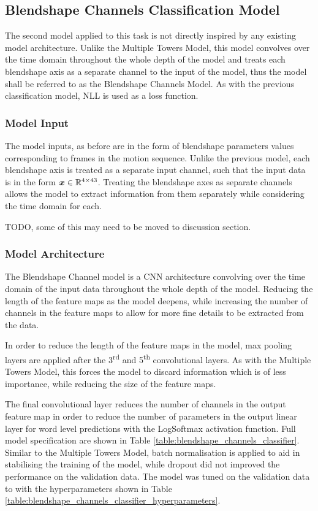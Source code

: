 \subsection{Blendshape Channels Classification Model}
The second model applied to this task is not directly inspired by any existing model architecture.
Unlike the Multiple Towers Model, this model convolves over the time domain throughout the whole depth of the model and treats each blendshape axis as a separate channel to the input of the model, thus the model shall be referred to as the Blendshape Channels Model.
As with the previous classification model, NLL is used as a loss function.

\subsubsection{Model Input}
The model inputs, as before are in the form of blendshape parameters values corresponding to frames in the motion sequence.
Unlike the previous model, each blendshape axis is treated as a separate input channel, such that the input data is in the form ${\boldsymbol{{x}}} \in \mathbb{R}^{4 \times 43}$.
Treating the blendshape axes as separate channels allows the model to extract information from them separately while considering the time domain for each.

TODO, some of this may need to be moved to discussion section.

\subsubsection{Model Architecture}
The Blendshape Channel model is a CNN architecture convolving over the time domain of the input data throughout the whole depth of the model.
Reducing the length of the feature maps as the model deepens, while increasing the number of channels in the feature maps to allow for more fine details to be extracted from the data.

In order to reduce the length of the feature maps in the model, max pooling layers are applied after the 3\textsuperscript{rd} and 5\textsuperscript{th} convolutional layers.
As with the Multiple Towers Model, this forces the model to discard information which is of less importance, while reducing the size of the feature maps.

The final convolutional layer reduces the number of channels in the output feature map in order to reduce the number of parameters in the output linear layer for word level predictions with the LogSoftmax activation function.
Full model specification are shown in Table \ref{table:blendshape_channels_classifier}.
Similar to the Multiple Towers Model, batch normalisation is applied to aid in stabilising the training of the model, while dropout did not improved the performance on the validation data.
The model was tuned on the validation data to with the hyperparameters shown in Table \ref{table:blendshape_channels_classifier_hyperparameters}.

